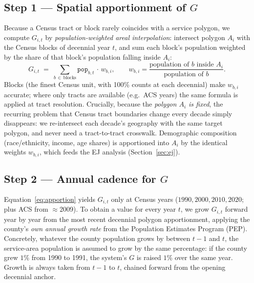 \documentclass[11pt]{article}
\newcommand{\geopop}{\ensuremath{G}}
\begin{document}
\subsection{Step 1 --- Spatial apportionment of $\geopop$}
\label{sec:apportion}
Because a Census tract or block rarely coincides with a service polygon, we compute
$\geopop_{i,t}$ by \emph{population-weighted areal interpolation}: intersect polygon
$A_i$ with the Census blocks of decennial year $t$, and sum each block's population
weighted by the share of that block's population falling inside $A_i$:
\begin{equation}
\geopop_{i,t} \;=\; \sum_{b\,\in\,\text{blocks}} \texttt{pop}_{b,t}\,\cdot\,
  w_{b,i}, \qquad
  w_{b,i} = \frac{\text{population of } b \text{ inside } A_i}{\text{population of } b}.
\label{eq:apportion}
\end{equation}
Blocks (the finest Census unit, with 100\% counts at each decennial) make $w_{b,i}$
accurate; where only tracts are available (e.g.\ ACS years) the same formula is
applied at tract resolution. Crucially, because the \emph{polygon $A_i$ is fixed},
the recurring problem that Census tract boundaries change every decade simply
disappears: we re-intersect each decade's geography with the same target polygon, and
never need a tract-to-tract crosswalk. Demographic composition (race/ethnicity,
income, age shares) is apportioned into $A_i$ by the identical weights $w_{b,i}$,
which feeds the EJ analysis (Section~\ref{sec:ej}).

\subsection{Step 2 --- Annual cadence for $\geopop$}
\label{sec:cadence}
Equation~\eqref{eq:apportion} yields $\geopop_{i,t}$ only at Census years
($1990,2000,2010,2020$; plus ACS from $\approx$2009). To obtain a value for every
year $t$, we grow $\geopop_{i,t}$ forward year by year from the most recent decennial
polygon apportionment, applying the county's \emph{own annual growth rate} from the
Population Estimates Program (PEP). Concretely, whatever the county population grows by
between $t-1$ and $t$, the service-area population is assumed to grow by the same
percentage: if the county grew $1\%$ from 1990 to 1991, the system's $\geopop$ is
raised $1\%$ over the same year. Growth is always taken from $t-1$ to $t$, chained
forward from the opening decennial anchor.
\end{document}
